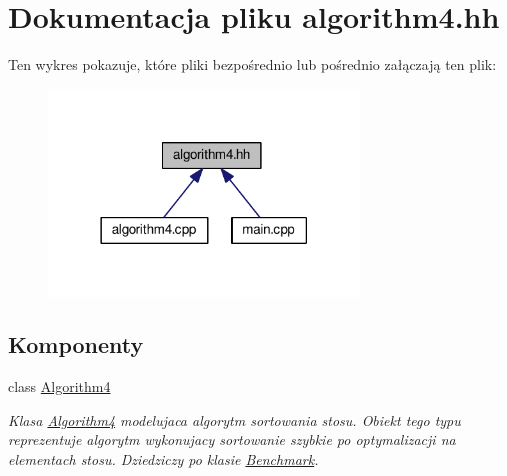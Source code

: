 \hypertarget{algorithm4_8hh}{\section{Dokumentacja pliku algorithm4.\-hh}
\label{algorithm4_8hh}
}
Ten wykres pokazuje, które pliki bezpośrednio lub pośrednio załączają ten plik\-:
\nopagebreak
\begin{figure}[H]
\begin{center}
\leavevmode
\includegraphics[width=234pt]{algorithm4_8hh__dep__incl}
\end{center}
\end{figure}
\subsection*{Komponenty}
\begin{DoxyCompactItemize}
\item 
class \hyperlink{class_algorithm4}{Algorithm4}
\begin{DoxyCompactList}\small\item\em Klasa \hyperlink{class_algorithm4}{Algorithm4} modelujaca algorytm sortowania stosu. Obiekt tego typu reprezentuje algorytm wykonujacy sortowanie szybkie po optymalizacji na elementach stosu. Dziedziczy po klasie \hyperlink{class_benchmark}{Benchmark}. \end{DoxyCompactList}\end{DoxyCompactItemize}
